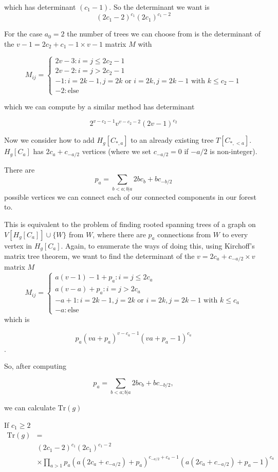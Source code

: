 \documentclass[10pt]{article}
\newcommand{\Tr}{\text{Tr}}
\begin{document}
which has determinant $(c_1-1)$. So the determinant we want is
\[(2c_1-2)^{c_1}(2c_1)^{c_1-2}\]

For the case $a_0=2$ the number of trees we can choose from is the determinant of the $v-1=2c_2+c_1-1 \times v-1$ matrix $M$ with

\[M_{ij} = \left\{\begin{array}{ll}
2v-3:i=j\le2c_2-1\\
2v-2:i=j >2c_2-1\\
-1:i=2k-1,j=2k \text{ or }i=2k,j=2k-1 \text{ with } k \le c_2-1\\
-2:\text{else}\end{array}\right.\]

which we can compute by a similar method has determinant

\[2^{v-c_2-1}v^{v-c_2-2}(2v-1)^{c_2}\]

Now we consider how to add $H_g[C_{*,a}]$ to an already existing tree $T[C_{*,<a}]$.  $H_g[C_a]$ has $2c_a+c_{-a/2}$ vertices (where we set $c_{-a/2}=0$ if $-a/2$ is non-integer).

There are
\[p_a = \sum_{b<a;b|a}2bc_b+bc_{-b/2}\]
possible vertices we can connect each of our connected components in our forest to.

This is equivalent to the problem of finding rooted spanning trees of a graph on $V[H_g[C_a]] \cup \{W\}$ from $W$, where there are $p_a$ connections from $W$ to every vertex in $H_g[C_a]$. Again, to enumerate the ways of doing this, using Kirchoff's matrix tree theorem, we want to find the determinant of the $v=2c_a+c_{-a/2} \times v$ matrix $M$
\[M_{ij} = \left\{\begin{array}{ll}
a(v-1)-1+p_a:i=j\le 2c_a\\
a(v-a)+p_a:i=j >2c_a\\
-a+1:i=2k-1,j=2k \text{ or }i=2k,j=2k-1 \text{ with }k\le c_a\\
-a:\text{else}\end{array}\right.\]
which is

\[p_a(va+p_a)^{v-c_a-1}(va+p_a-1)^{c_a}\].

So, after computing

\[p_a = \sum_{b<a;b|a}2bc_b+bc_{-b/2},\]

we can calculate $\Tr(g)$

If $c_1\ge 2$
\begin{align*}
  \Tr(g)&=\\
  &(2c_1-2)^{c_1}(2c_1)^{c_1-2}\\
  &\times \prod_{a >1}p_a(a(2c_a+c_{-a/2})+p_a)^{c_{-a/2}+c_a-1}(a(2c_a+c_{-a/2})+p_a-1)^{c_a}\\
\end{align*}
\end{document}
